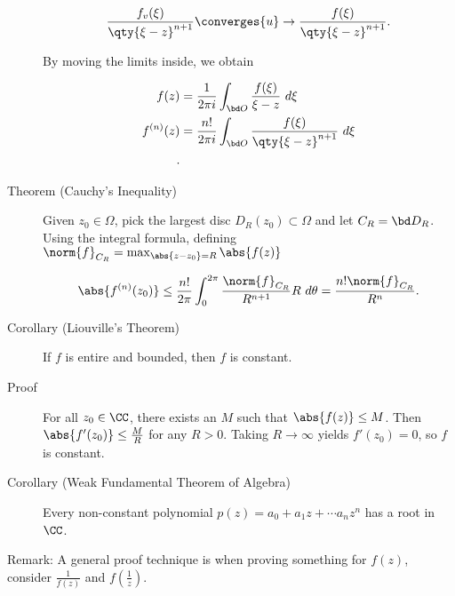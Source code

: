 \begin{description}
\begin{align*}
\frac{f_v(\xi)}{\qty{\xi - z}^{n+1}} \converges{u}\to
\frac{f(\xi)}{\qty{\xi - z}^{n+1}}
.\end{align*}

By moving the limits inside, we obtain

\begin{align*}
f(z) &= \frac{1}{2\pi i} \int_{\bd O} \frac{f(\xi)}{\xi - z}~d\xi \\
f^{(n)}(z) &= \frac{n!}{2\pi i} \int_{\bd O} \frac{f(\xi)}{\qty{ \xi - z}^{n+1} }~d\xi \\
.\end{align*}
\item[Theorem (Cauchy's Inequality)]
Given \(z_0\in \Omega\), pick the largest disc
\(D_R(z_0) \subset \Omega\) and let \(C_R = \bd D_R\). Using the
integral formula, defining
\(\norm{f}_{C_R} = \max_{\abs{z-z_0} = R} \abs{f(z)}\)

\begin{align*}
\abs{ f^{(n)}(z_0) } \leq \frac{n!}{2\pi} \int_0^{2\pi} \frac{\norm{f}_{C_R}}{R^{n+1}} R~d\theta = \frac{n! \norm{f}_{C_R}}{R^{n}}
.\end{align*}
\item[Corollary (Liouville's Theorem)]
If \(f\) is entire and bounded, then \(f\) is constant.
\item[Proof]
For all \(z_0 \in \CC\), there exists an \(M\) such that
\(\abs{f(z)} \leq M\). Then \(\abs{f'(z_0)} \leq \frac{M}{R}\) for any
\(R> 0\). Taking \(R\to \infty\) yields \(f'(z_0) = 0\), so \(f\) is
constant.
\item[Corollary (Weak Fundamental Theorem of Algebra)]
Every non-constant polynomial \(p(z) = a_0 + a_1z + \cdots a_n z^n\) has
a root in \(\CC\).
\end{description}

Remark: A general proof technique is when proving something for
\(f(z)\), consider \(\frac{1}{f(z)}\) and \(f(\frac 1 z)\).

